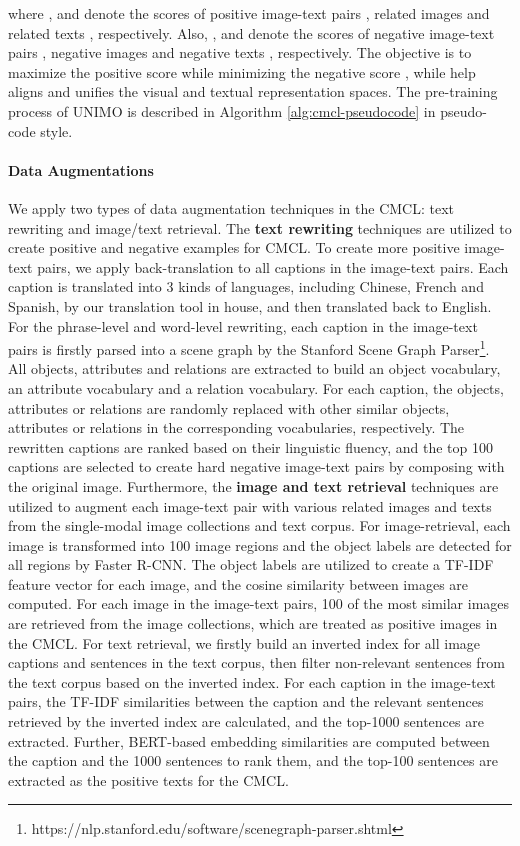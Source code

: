 \documentclass[11pt,a4paper]{article}
\begin{document}
where ,  and  denote the scores of positive image-text pairs , related images  and related texts , respectively.
Also, ,  and  denote the scores of negative image-text pairs , negative images  and negative texts , respectively.
The objective is to maximize the positive score  while minimizing the negative score , while help aligns and unifies the visual and textual representation spaces. The pre-training process of UNIMO is described in Algorithm \ref{alg:cmcl-pseudocode} in pseudo-code style.



\paragraph{Data Augmentations} We apply two types of data augmentation techniques in the CMCL: text rewriting and image/text retrieval. The \textbf{text rewriting} techniques are utilized to create positive and negative examples for CMCL. To create more positive image-text pairs, we apply back-translation to all captions in the image-text pairs. Each caption is translated into 3 kinds of languages, including Chinese, French and Spanish, by our translation tool in house, and then translated back to English. For the phrase-level and word-level rewriting, each caption in the image-text pairs is firstly parsed into a scene graph by the Stanford Scene Graph Parser\footnote{https://nlp.stanford.edu/software/scenegraph-parser.shtml}. All objects, attributes and relations are extracted to build an object vocabulary, an attribute vocabulary and a relation vocabulary. For each caption, the objects, attributes or relations are randomly replaced with other similar objects, attributes or relations in the corresponding vocabularies, respectively. The rewritten captions are ranked based on their linguistic fluency, and the top 100 captions are selected to create hard negative image-text pairs by composing with the original image.
Furthermore, the \textbf{image and text retrieval} techniques are utilized to augment each image-text pair with various related images and texts from the single-modal image collections and text corpus.
For image-retrieval, each image is transformed into 100 image regions and the object labels are detected for all regions by Faster R-CNN.
The object labels are utilized to create a TF-IDF feature vector for each image, and the cosine similarity between images are computed.
For each image in the image-text pairs, 100 of the most similar images are retrieved from the image collections, which are treated as positive images in the CMCL.
For text retrieval, we firstly build an inverted index for all image captions and sentences in the text corpus, then filter non-relevant sentences from the text corpus based on the inverted index.
For each caption in the image-text pairs, the TF-IDF similarities between the caption and the relevant sentences retrieved by the inverted index are calculated, and the top-1000 sentences are extracted.
Further, BERT-based embedding similarities are computed between the caption and the 1000 sentences to rank them, and the top-100 sentences are extracted as the positive texts for the CMCL.
\end{document}
